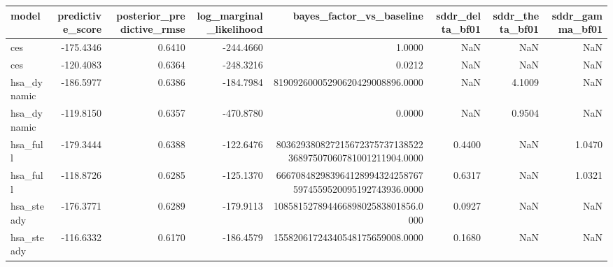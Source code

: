 \begin{tabular}{lrrrrrrr}
\toprule
model & predictive\_score & posterior\_predictive\_rmse & log\_marginal\_likelihood & bayes\_factor\_vs\_baseline & sddr\_delta\_bf01 & sddr\_theta\_bf01 & sddr\_gamma\_bf01 \\
\midrule
ces & -175.4346 & 0.6410 & -244.4660 & 1.0000 & NaN & NaN & NaN \\
ces & -120.4083 & 0.6364 & -248.3216 & 0.0212 & NaN & NaN & NaN \\
hsa\_dynamic & -186.5977 & 0.6386 & -184.7984 & 81909260005290620429008896.0000 & NaN & 4.1009 & NaN \\
hsa\_dynamic & -119.8150 & 0.6357 & -470.8780 & 0.0000 & NaN & 0.9504 & NaN \\
hsa\_full & -179.3444 & 0.6388 & -122.6476 & 80362938082721567237573713852236897507060781001211904.0000 & 0.4400 & NaN & 1.0470 \\
hsa\_full & -118.8726 & 0.6285 & -125.1370 & 6667084829839641289943242587675974559520095192743936.0000 & 0.6317 & NaN & 1.0321 \\
hsa\_steady & -176.3771 & 0.6289 & -179.9113 & 10858152789446689802583801856.0000 & 0.0927 & NaN & NaN \\
hsa\_steady & -116.6332 & 0.6170 & -186.4579 & 15582061724340548175659008.0000 & 0.1680 & NaN & NaN \\
\bottomrule
\end{tabular}
